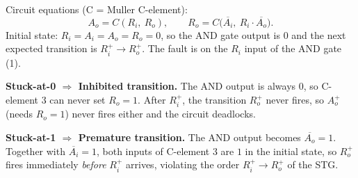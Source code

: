 \documentclass[a4paper, 10pt]{article}
\begin{document}
\begin{problem}
\begin{minipage}[c]{0.42\linewidth}
{%
	}
\end{minipage}

\end{problem}

\begin{solution}
	\noindent Circuit equations (C = Muller C-element):
	\[
		A_o = C(R_i,\ R_o),\qquad R_o = C\big(\overline{A_i},\ R_i\cdot\overline{A_o}\big).
	\]
	Initial state: \(R_i = A_i = A_o = R_o = 0\), so the AND gate output is \(0\) and the next expected transition is \(R_i^+ \rightarrow R_o^+\).
	The fault is on the \(R_i\) input of the AND gate (1).

	\myspace

	\noindent\textbf{Stuck-at-0 \(\Rightarrow\) Inhibited transition.}
	The AND output is always \(0\), so C-element 3 can never set \(R_o = 1\).
	After \(R_i^+\), the transition \(R_o^+\) never fires, so \(A_o^+\) (needs \(R_o = 1\)) never fires either and the circuit deadlocks.

	\myspace

	\noindent\textbf{Stuck-at-1 \(\Rightarrow\) Premature transition.}
	The AND output becomes \(\overline{A_o} = 1\). Together with \(\overline{A_i} = 1\), both inputs of C-element 3 are \(1\) in the initial state,
	so \(R_o^+\) fires immediately \emph{before} \(R_i^+\) arrives, violating the order \(R_i^+ \rightarrow R_o^+\) of the STG.
\end{solution}
\end{document}
